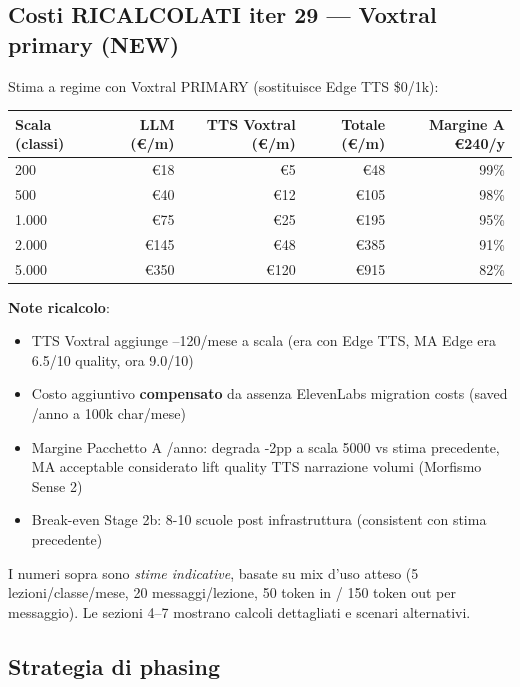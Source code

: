 \documentclass[12pt,a4paper]{article}
\begin{document}
\subsection*{Costi RICALCOLATI iter 29 — Voxtral primary (NEW)}

Stima a regime con Voxtral PRIMARY (sostituisce Edge TTS \$0/1k):

\begin{center}
\begin{tabular}{lrrrr}
\toprule
\textbf{Scala (classi)} & \textbf{LLM (€/m)} & \textbf{TTS Voxtral (€/m)} & \textbf{Totale (€/m)} & \textbf{Margine A €240/y} \\
\midrule
200    & €18  & €5   & ~€48   & 99\% \\
500    & €40  & €12  & ~€105  & 98\% \\
1.000  & €75  & €25  & ~€195  & 95\% \\
2.000  & €145 & €48  & ~€385  & 91\% \\
5.000  & €350 & €120 & ~€915  & 82\% \\
\bottomrule
\end{tabular}
\end{center}

\textbf{Note ricalcolo}:
\begin{itemize}[leftmargin=*]
  \item TTS Voxtral aggiunge --120/mese a scala (era  con Edge TTS, MA Edge era 6.5/10 quality, ora 9.0/10)
  \item Costo aggiuntivo \textbf{compensato} da assenza ElevenLabs migration costs (saved /anno a 100k char/mese)
  \item Margine Pacchetto A /anno: degrada -2pp a scala 5000 vs stima precedente, MA acceptable considerato lift quality TTS narrazione volumi (Morfismo Sense 2)
  \item Break-even Stage 2b: 8-10 scuole post infrastruttura (consistent con stima precedente)
\end{itemize}

I numeri sopra sono \emph{stime indicative}, basate su mix d'uso atteso (5 lezioni/classe/mese,
20 messaggi/lezione, 50 token in / 150 token out per messaggio).
Le sezioni 4--7 mostrano calcoli dettagliati e scenari alternativi.

\subsection*{Strategia di phasing}
\end{document}
